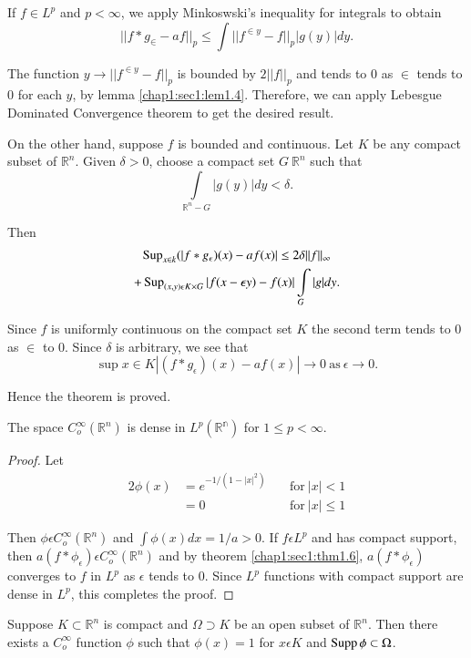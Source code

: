 If $f \in L^p$ and $p < \infty$, we apply Minkoswski's inequality  for
integrals to obtain 
$$
|| f*g_ \in - af ||_p \leq \int || f^{\in y}-f || _p |g(y)|dy.
$$

The function $y \to || f^{\in y}- f ||_p$ is bounded by $2 || f || _p$
and tends to 0 as $\in$ tends to 0 for each $y$, by
lemma \ref{chap1:sec1:lem1.4}. 
Therefore, we can apply Lebesgue Dominated Convergence theorem
to get the desired result. 

On the other hand, suppose $f$ is bounded and continuous. Let $K$ be
any compact subset of $\mathbb{R}^n$. Given $\delta > 0$, choose a
compact set $G~ \mathbb{R}^n$ such that 
$$
\int\limits_{\mathbb{R}^n -G} |g(y)|dy < \delta.
$$\pageoriginale

Then
\begin{multline*}
\operatorname{Sup}\limits_{x \in k}( |f *g_\epsilon) (x) - af (x) | \leq 2 \delta
|| f || _ \infty \\
+ \operatorname{Sup}\limits_{(x, y)\epsilon K \times G}  |f(x-
\epsilon y) - f(x)| \int \limits_G | g | dy.
\end{multline*}

Since $f$ is
uniformly continuous on the compact set $K$ the second  term tends to
0 as $\in$ to 0. Since $\delta$ is arbitrary, we see that 
$$
\sup\limits {x \in K} |(f*g_ \epsilon ) (x) - af (x)| \to 0
~\text{as}~ \epsilon \to 0. 
$$

Hence the theorem is proved.
\setcounter{coro}{6}
\begin{coro} \label{chap1:sec1:coro1.7}%
  The space $C^\infty _o (\mathbb{R}^n)$ is dense in $L^p
  (\mathbb{R^n})$ for $1 \leq p < \infty$. 
\end{coro}
\begin{proof}
  Let
  \begin{alignat*}{2}
    \phi (x) & = e^{-1/(1-|x|^2)} ~&&\text{for}~ |x|< 1 \\
    &= 0  &&\text{for}~ |x| \leq 1
  \end{alignat*}

  Then $\phi \epsilon C^\infty _o (\mathbb{R}^n)$ and $\int \phi (x)
  dx = 1/a >0$. If $f \epsilon L^p$ and has compact support, then
  $a(f* \phi _ \epsilon ) \epsilon C^ \infty _o (\mathbb{R}^n)$
  and by theorem \ref{chap1:sec1:thm1.6}, $a(f* \phi_ \epsilon )$ converges to $f$ in
  $L^p$ as $\epsilon$ tends to 0. Since $L^p$ functions with
  compact support are dense in $L^p$, this completes the proof. 
\end{proof}

\setcounter{prop}{7}
\begin{prop} \label{chap1:sec1:prop1.8}%
  Suppose $K \subset \mathbb{R}^n$ is compact and $\Omega
  \supset K$ be an open subset of $\mathbb{R}^n$. Then there exists a
  $C^\infty _o$ function $\phi$ such that $\phi (x) = 1$ for $x
  \epsilon K$ and $ \operatorname{Supp}  \phi \subset \Omega$. 
\end{prop}

